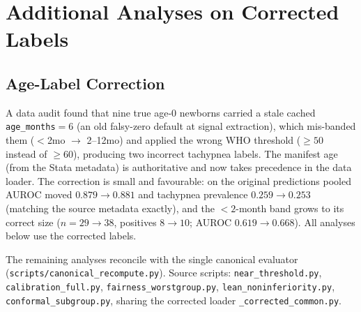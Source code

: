 \section{Additional Analyses on Corrected Labels}
\label{app:reviewer}

\subsection{Age-Label Correction}\label{app:agefix}
A data audit found that nine true age-$0$ newborns carried a stale cached \texttt{age\_months}$=6$ (an old
falsy-zero default at signal extraction), which mis-banded them ($<$2mo $\to$ 2--12mo) and applied the wrong
WHO threshold ($\ge 50$ instead of $\ge 60$), producing two incorrect tachypnea labels. The manifest age
(from the Stata metadata) is authoritative and now takes precedence in the data loader. The correction is
small and favourable: on the original predictions pooled AUROC moved $0.879 \to 0.881$ and tachypnea
prevalence $0.259 \to 0.253$ (matching the
source metadata exactly), and the $<2$-month band grows to its correct size ($n{=}29 \to 38$, positives
$8 \to 10$; AUROC $0.619 \to 0.668$). All analyses below use the corrected labels.

The remaining analyses reconcile with the single canonical evaluator
(\texttt{scripts/canonical\_recompute.py}). Source scripts: \texttt{near\_threshold.py},
\texttt{calibration\_full.py}, \texttt{fairness\_worstgroup.py}, \texttt{lean\_noninferiority.py},
\texttt{conformal\_subgroup.py}, sharing the corrected loader \texttt{\_corrected\_common.py}.

